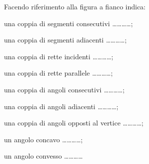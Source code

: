 \newpage

\begin{esercizio}
\label{ese:1.59}
Facendo riferimento alla figura a fianco indica:

\begin{minipage}{.60\textwidth}
\begin{enumeratea}
\item una coppia di segmenti consecutivi \ldots\ldots\ldots\ldots{};
\item una coppia di segmenti adiacenti \ldots\ldots\ldots\ldots{};
\item una coppia di rette incidenti \ldots\ldots\ldots\ldots{};
\item una coppia di rette parallele \ldots\ldots\ldots\ldots{};
\item una coppia di angoli consecutivi \ldots\ldots\ldots\ldots{};
\item una coppia di angoli adiacenti \ldots\ldots\ldots\ldots{};
\item una coppia di angoli opposti al vertice 
\ldots\ldots\ldots\ldots{};
\item un angolo concavo \ldots\ldots\ldots\ldots{};
\item un angolo convesso \ldots\ldots\ldots\ldots{}
\end{enumeratea}
\end{minipage}
\hfill
\begin{minipage}{.34\textwidth}
\begin{inaccessibleblock}
 \centering
\end{inaccessibleblock}
\end{minipage}
\end{esercizio}

% 

